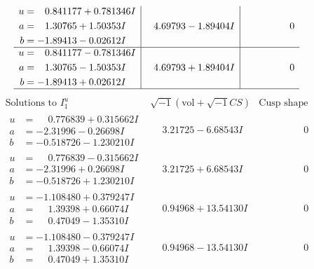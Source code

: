 \documentclass[1p]{elsarticle_modified}
\theoremstyle{definition}
\newcommand{\I}{\sqrt{-1}}
\begin{document}
$$\begin{array}{c|c|c}
\begin{aligned}
u &= \phantom{-}0.841177 + 0.781346 I \\
a &= \phantom{-}1.30765 + 1.50353 I \\
b &= -1.89413 - 0.02612 I\end{aligned}
 & \phantom{-}4.69793 - 1.89404 I & \phantom{-0.000000 } 0 \\ \hline\begin{aligned}
u &= \phantom{-}0.841177 - 0.781346 I \\
a &= \phantom{-}1.30765 - 1.50353 I \\
b &= -1.89413 + 0.02612 I\end{aligned}
 & \phantom{-}4.69793 + 1.89404 I & \phantom{-0.000000 } 0\\
 \hline 
 \end{array}$$\newpage$$\begin{array}{c|c|c}  
\text{Solutions to }I^u_{1}& \I (\text{vol} + \sqrt{-1}CS) & \text{Cusp shape}\\
 \hline 
\begin{aligned}
u &= \phantom{-}0.776839 + 0.315662 I \\
a &= -2.31996 - 0.26698 I \\
b &= -0.518726 - 1.230210 I\end{aligned}
 & \phantom{-}3.21725 - 6.68543 I & \phantom{-0.000000 } 0 \\ \hline\begin{aligned}
u &= \phantom{-}0.776839 - 0.315662 I \\
a &= -2.31996 + 0.26698 I \\
b &= -0.518726 + 1.230210 I\end{aligned}
 & \phantom{-}3.21725 + 6.68543 I & \phantom{-0.000000 } 0 \\ \hline\begin{aligned}
u &= -1.108480 + 0.379247 I \\
a &= \phantom{-}1.39398 + 0.66074 I \\
b &= \phantom{-}0.47049 - 1.35310 I\end{aligned}
 & \phantom{-}0.94968 + 13.54130 I & \phantom{-0.000000 } 0 \\ \hline\begin{aligned}
u &= -1.108480 - 0.379247 I \\
a &= \phantom{-}1.39398 - 0.66074 I \\
b &= \phantom{-}0.47049 + 1.35310 I\end{aligned}
 & \phantom{-}0.94968 - 13.54130 I & \phantom{-0.000000 } 0 \\ \hline\begin{aligned}

\end{aligned}
\end{array}$$
\end{document}

